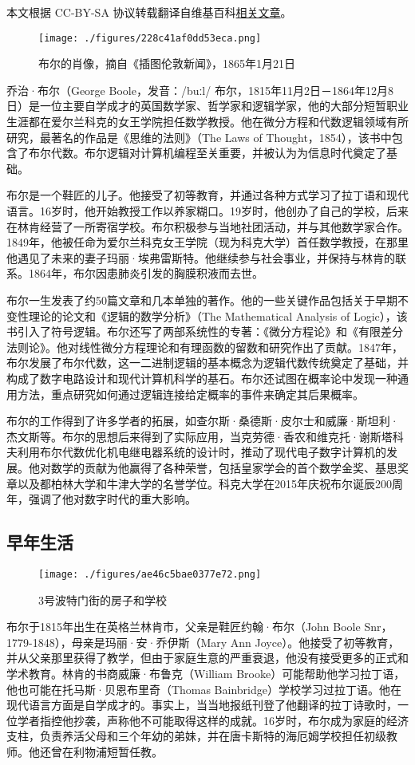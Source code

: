 
本文根据 CC-BY-SA 协议转载翻译自维基百科\href{https://en.wikipedia.org/wiki/George_Boole#}{相关文章}。

\begin{figure}[ht]
\centering
\texttt{[image: ./figures/228c41af0dd53eca.png]}
\caption{布尔的肖像，摘自《插图伦敦新闻》，1865年1月21日} \label{fig_George_1}
\end{figure}
乔治·布尔（George Boole，发音：/buːl/ 布尔，1815年11月2日－1864年12月8日）是一位主要自学成才的英国数学家、哲学家和逻辑学家，他的大部分短暂职业生涯都在爱尔兰科克的女王学院担任数学教授。他在微分方程和代数逻辑领域有所研究，最著名的作品是《思维的法则》（The Laws of Thought，1854），该书中包含了布尔代数。布尔逻辑对计算机编程至关重要，并被认为为信息时代奠定了基础。

布尔是一个鞋匠的儿子。他接受了初等教育，并通过各种方式学习了拉丁语和现代语言。16岁时，他开始教授工作以养家糊口。19岁时，他创办了自己的学校，后来在林肯经营了一所寄宿学校。布尔积极参与当地社团活动，并与其他数学家合作。1849年，他被任命为爱尔兰科克女王学院（现为科克大学）首任数学教授，在那里他遇见了未来的妻子玛丽·埃弗雷斯特。他继续参与社会事业，并保持与林肯的联系。1864年，布尔因患肺炎引发的胸膜积液而去世。

布尔一生发表了约50篇文章和几本单独的著作。他的一些关键作品包括关于早期不变性理论的论文和《逻辑的数学分析》（The Mathematical Analysis of Logic），该书引入了符号逻辑。布尔还写了两部系统性的专著：《微分方程论》和《有限差分法则论》。他对线性微分方程理论和有理函数的留数和研究作出了贡献。1847年，布尔发展了布尔代数，这一二进制逻辑的基本概念为逻辑代数传统奠定了基础，并构成了数字电路设计和现代计算机科学的基石。布尔还试图在概率论中发现一种通用方法，重点研究如何通过逻辑连接给定概率的事件来确定其后果概率。

布尔的工作得到了许多学者的拓展，如查尔斯·桑德斯·皮尔士和威廉·斯坦利·杰文斯等。布尔的思想后来得到了实际应用，当克劳德·香农和维克托·谢斯塔科夫利用布尔代数优化机电继电器系统的设计时，推动了现代电子数字计算机的发展。他对数学的贡献为他赢得了各种荣誉，包括皇家学会的首个数学金奖、基思奖章以及都柏林大学和牛津大学的名誉学位。科克大学在2015年庆祝布尔诞辰200周年，强调了他对数字时代的重大影响。
\subsection{早年生活}
\begin{figure}[ht]
\centering
\texttt{[image: ./figures/ae46c5bae0377e72.png]}
\caption{3号波特门街的房子和学校} \label{fig_George_2}
\end{figure}
布尔于1815年出生在英格兰林肯市，父亲是鞋匠约翰·布尔（John Boole Snr，1779-1848），母亲是玛丽·安·乔伊斯（Mary Ann Joyce）。他接受了初等教育，并从父亲那里获得了教学，但由于家庭生意的严重衰退，他没有接受更多的正式和学术教育。林肯的书商威廉·布鲁克（William Brooke）可能帮助他学习拉丁语，他也可能在托马斯·贝恩布里奇（Thomas Bainbridge）学校学习过拉丁语。他在现代语言方面是自学成才的。事实上，当当地报纸刊登了他翻译的拉丁诗歌时，一位学者指控他抄袭，声称他不可能取得这样的成就。16岁时，布尔成为家庭的经济支柱，负责养活父母和三个年幼的弟妹，并在唐卡斯特的海厄姆学校担任初级教师。他还曾在利物浦短暂任教。